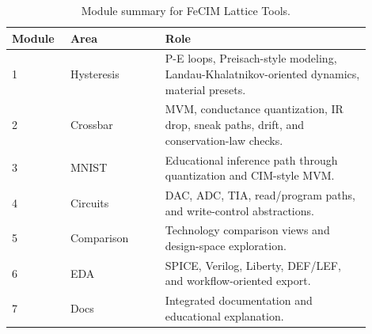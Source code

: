\begin{table}[ht]
\centering
\caption{Module summary for FeCIM Lattice Tools.}
\label{tab:module-summary}
\begin{tabular}{p{0.14\linewidth}p{0.24\linewidth}p{0.52\linewidth}}
\toprule
Module & Area & Role \\
\midrule
1 & Hysteresis & P-E loops, Preisach-style modeling, Landau-Khalatnikov-oriented dynamics, material presets. \\
2 & Crossbar & MVM, conductance quantization, IR drop, sneak paths, drift, and conservation-law checks. \\
3 & MNIST & Educational inference path through quantization and CIM-style MVM. \\
4 & Circuits & DAC, ADC, TIA, read/program paths, and write-control abstractions. \\
5 & Comparison & Technology comparison views and design-space exploration. \\
6 & EDA & SPICE, Verilog, Liberty, DEF/LEF, and workflow-oriented export. \\
7 & Docs & Integrated documentation and educational explanation. \\
\bottomrule
\end{tabular}
\end{table}

